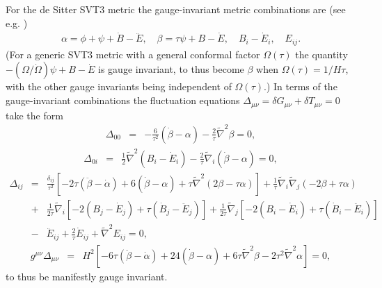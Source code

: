 For the de Sitter SVT3 metric the gauge-invariant metric combinations are (see e.g. \cite{amarasinghe_2019})
%
\begin{eqnarray}
\alpha=\phi+\psi+\dot{B}-\ddot{E} ,\quad \beta=\tau\psi+B-\dot{E}, \quad B_i-\dot{E}_i,\quad E_{ij}.
\label{7.3}
\end{eqnarray}
%
(For a generic SVT3 metric with a general conformal factor $\Omega(\tau)$ the quantity $-(\Omega/\dot{\Omega})\psi+B-\dot{E}$ is gauge invariant, to thus become $\beta$ when $\Omega(\tau)=1/H\tau$, with the other gauge invariants being independent of $\Omega(\tau)$.)
In terms of the gauge-invariant combinations the fluctuation equations $\Delta_{\mu\nu}=\delta G_{\mu\nu}+\delta T_{\mu\nu}=0$ take the form
%
\begin{eqnarray}
\Delta_{00}&=&-\frac{6}{\tau^2}(\dot{\beta}-\alpha)-\frac{2}{\tau}\tilde{\nabla}^2\beta=0,
\label{7.4}
\end{eqnarray}
%
\begin{eqnarray}
\Delta_{0i}&=&\frac{1}{2}\tilde{\nabla}^2(B_i-\dot{E}_i)-\frac{2}{\tau}\tilde{\nabla}_i(\dot{\beta}-\alpha)=0,
\label{7.5}
\end{eqnarray}
%
\begin{eqnarray}
\Delta_{ij}&=&\frac{\delta_{ij}}{\tau^2}\left[-2\tau(\ddot{\beta}-\dot{\alpha})+6(\dot{\beta}-\alpha)+\tau \tilde{\nabla}^2(2\beta-\tau \alpha)\right]
+\frac{1}{\tau}\tilde{\nabla}_i\tilde{\nabla}_j(-2 \beta +\tau\alpha)
\nonumber\\
&+&\frac{1}{2\tau}\tilde{\nabla}_i[-2(B_j-\dot{E}_j)+\tau(\dot{B}_j-\ddot{E}_j)]
+\frac{1}{2\tau}\tilde{\nabla}_j[-2(B_i-\dot{E}_i)+\tau(\dot{B}_i-\ddot{E}_i)]
\nonumber\\
&-&\ddot{E}_{ij}+\frac{2}{\tau}\dot{E}_{ij}+\tilde{\nabla}^2E_{ij}=0,
\label{7.6}
\end{eqnarray}
%
\begin{eqnarray}
g^{\mu\nu}\Delta_{\mu\nu}&=&H^2[-6\tau(\ddot{\beta}-\dot{\alpha})+24(\dot{\beta}-\alpha)
+6\tau \tilde{\nabla}^2\beta-2\tau^2\tilde{\nabla}^2\alpha]=0,
\label{7.7}
\end{eqnarray}
%
to thus be manifestly gauge invariant.

